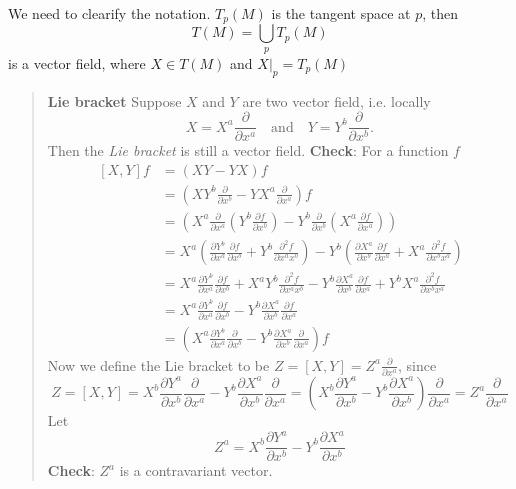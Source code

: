 We need to clearify the notation. $T_{p}(M)$ is the tangent space at $p$, then 
\begin{equation}
T(M)=\bigcup_{p} T_{p}(M)
\end{equation}
is a vector field, where $X\in T(M)$ and $X\bigg|_{p} = T_{p}(M)$

\begin{quote}
	\textbf{Lie bracket}
Suppose $X$ and $Y$ are two vector field, i.e. locally
\begin{equation}
X=X^{a}\frac{\partial}{\partial x^{a}}
\quad\text{and}\quad
Y=Y^{b}\frac{\partial}{\partial x^{b}}.
\end{equation}
Then the \textit{Lie bracket} is still a vector field.
\textbf{Check}: For a function $f$
\begin{equation}
\begin{aligned}
\,[X,Y] f
&= \left(XY-YX\right)f\\
&= \left(XY^{b}\frac{\partial}{\partial x^{b}}-YX^{a}\frac{\partial}{\partial x^{a}}\right)f\\
&= \left(
X^{a} \frac{\partial}{\partial x^{a}}
\left(Y^{b}\frac{\partial f}{\partial x^{b}}\right)
-
Y^{b}\frac{\partial}{\partial x^{b}}
\left(X^{a}\frac{\partial f}{\partial x^{a}}\right)\right)\\
&= X^{a}\left(\frac{\partial Y^{b} }{\partial x^{a}}\frac{\partial f}{\partial x^{b}} + Y^{b}\frac{\partial^2 f}{\partial x^{a}x^{b}}\right)
-
Y^{b}\left(\frac{\partial X^{a}}{\partial x^{b}}\frac{\partial f}{\partial x^{a}}+X^{a}\frac{\partial^2 f}{\partial x^{b}x^{a}}\right)\\
&= X^{a}\frac{\partial Y^{b} }{\partial x^{a}}\frac{\partial f}{\partial x^{b}}
+ X^{a}Y^{b}\frac{\partial^2 f}{\partial x^{a}x^{b}}
- Y^{b}\frac{\partial X^{a}}{\partial x^{b}}\frac{\partial f}{\partial x^{a}}
+Y^{b}X^{a}\frac{\partial^2 f}{\partial x^{b}x^{a}}\\
&= X^{a}\frac{\partial Y^{b} }{\partial x^{a}}\frac{\partial f}{\partial x^{b}}
- Y^{b}\frac{\partial X^{a}}{\partial x^{b}}\frac{\partial f}{\partial x^{a}}\\
&= \left(X^{a}\frac{\partial Y^{b} }{\partial x^{a}}\frac{\partial}{\partial x^{b}} - Y^{b}\frac{\partial X^{a}}{\partial x^{b}}\frac{\partial}{\partial x^{a}}\right)f
\end{aligned}
\end{equation}
Now we define the Lie bracket to be $\displaystyle Z = [X,Y] = Z^{a}\frac{\partial}{\partial x^{a}}$, since
\begin{equation}
Z=[X,Y] = X^{b}\frac{\partial Y^{a} }{\partial x^{b}}\frac{\partial}{\partial x^{a}} - Y^{b}\frac{\partial X^{a}}{\partial x^{b}}\frac{\partial}{\partial x^{a}}
= \left(X^{b}\frac{\partial Y^{a} }{\partial x^{b}} - Y^{b}\frac{\partial X^{a}}{\partial x^{b}}\right)\frac{\partial}{\partial x^{a}}
= Z^{a}\frac{\partial}{\partial x^{a}}
\end{equation}
Let
\begin{equation}
Z^{a} =X^{b}\frac{\partial Y^{a} }{\partial x^{b}} - Y^{b}\frac{\partial X^{a}}{\partial x^{b}}
\end{equation}
\textbf{Check}: $Z^{a}$ is a contravariant vector.


\end{quote}

